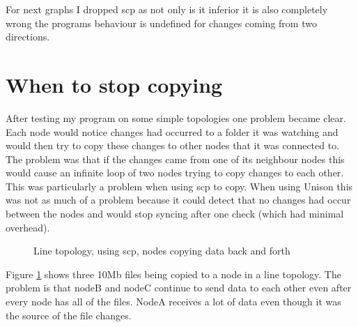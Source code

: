 \documentclass[12pt]{article}
\begin{document}
For next graphs I dropped scp as not only is it inferior it is also
completely wrong the programs behaviour is undefined for changes
coming from two directions.

\newpage
\section{When to stop copying}
After testing my program on some simple topologies one problem became
clear. Each node would notice changes had occurred to a folder
it was watching and would then try to copy these changes to other
nodes that it was connected to. The problem was that if the changes
came from one of its neighbour nodes this would cause an infinite loop
of two nodes trying to copy changes to each other. This was particularly 
a problem when using scp to copy. When using Unison this was not as much of
a problem because it could detect that no changes had occur between the nodes
and would stop syncing after one check (which had minimal overhead).

\begin{figure}[htp]
    \caption{Line topology, using scp, nodes copying data back and forth}
    \label{fig:line_scp_back_forth_graph}
\end{figure}

Figure \ref{fig:line_scp_back_forth_graph} shows three 10Mb files being copied to a node
in a line topology. The problem is that nodeB and nodeC continue to send
data to each other even after every node has all of the files. NodeA receives
a lot of data even though it was the source of the file changes. 
\end{document}
